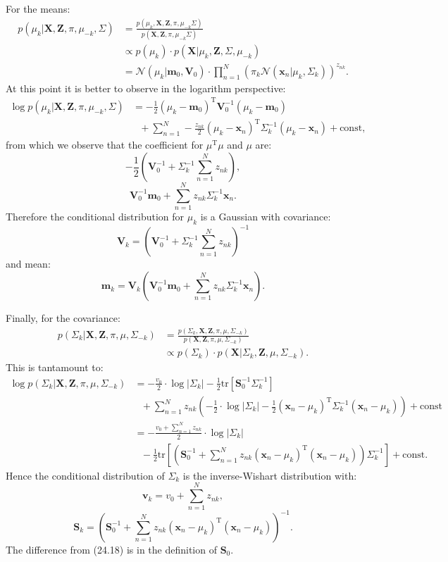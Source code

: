 \documentclass[UTF8]{ctexart}
\begin{document}
For the means:
$$
\begin{aligned}
p(\mu_{k}|\textbf{X},\textbf{Z},\pi,\mu_{-k},\Sigma)&=\frac{p(\mu_{k},\textbf{X},\textbf{Z},\pi,\mu_{-k}\Sigma)}{p(\textbf{X},\textbf{Z},\pi,\mu_{-k}\Sigma)}\\
&\propto p(\mu_{k})\cdot p(\textbf{X}|\mu_{k},\textbf{Z},\Sigma,\mu_{-k})\\
&=\mathcal{N}(\mu_{k}|\textbf{m}_{0},\textbf{V}_{0})\cdot \prod_{n=1}^{N}\left(\pi_{k}\mathcal{N}(\textbf{x}_{n}|\mu_{k},\Sigma_{k}) \right)^{z_{nk}}.
\end{aligned}
$$
At this point it is better to observe in the logarithm perspective:
$$
\begin{aligned}
\log p(\mu_{k}|\textbf{X},\textbf{Z},\pi,\mu_{-k},\Sigma)&=-\frac{1}{2}(\mu_{k}-\textbf{m}_{0})^{\text{T}}\textbf{V}_{0}^{-1}(\mu_{k}-\textbf{m}_{0}) \\
&\ \ \ +\sum_{n=1}^{N}-\frac{z_{nk}}{2}(\mu_{k}-\textbf{x}_{n})^{\text{T}}\Sigma_{k}^{-1}(\mu_{k}-\textbf{x}_{n})+\text{const},
\end{aligned}
$$
from which we observe that the coefficient for $\mu^{\text{T}}\mu$ and $\mu$ are:
$$-\frac{1}{2}\left(\textbf{V}_{0}^{-1}+\Sigma^{-1}_{k}\sum_{n=1}^{N}z_{nk} \right),$$
$$\textbf{V}^{-1}_{0}\textbf{m}_{0}+\sum_{n=1}^{N}z_{nk}\Sigma^{-1}_{k}\textbf{x}_{n}.$$
Therefore the conditional distribution for $\mu_{k}$ is a Gaussian with covariance:
$$\textbf{V}_{k}=\left(\textbf{V}_{0}^{-1}+\Sigma^{-1}_{k}\sum_{n=1}^{N}z_{nk} \right)^{-1}$$
and mean:
$$\textbf{m}_{k}=\textbf{V}_{k}\left(\textbf{V}^{-1}_{0}\textbf{m}_{0}+\sum_{n=1}^{N}z_{nk}\Sigma^{-1}_{k}\textbf{x}_{n} \right).$$

Finally, for the covariance:
$$
\begin{aligned}
p(\Sigma_{k}|\textbf{X},\textbf{Z},\pi,\mu,\Sigma_{-k})&=\frac{p(\Sigma_{k},\textbf{X},\textbf{Z},\pi,\mu,\Sigma_{-k})}{p(\textbf{X},\textbf{Z},\pi,\mu,\Sigma_{-k})}\\
&\propto p(\Sigma_{k})\cdot p(\textbf{X}|\Sigma_{k},\textbf{Z},\mu,\Sigma_{-k}).
\end{aligned}
$$
This is tantamount to:
$$
\begin{aligned}
\log p(\Sigma_{k}|\textbf{X},\textbf{Z},\pi,\mu,\Sigma_{-k})&=-\frac{v_{0}}{2}\cdot \log |\Sigma_{k}|-\frac{1}{2}\text{tr}[\textbf{S}_{0}^{-1}\Sigma_{k}^{-1}]\\
&\ \ \ +\sum_{n=1}^{N}z_{nk}\left(-\frac{1}{2}\cdot\log|\Sigma_{k}|-\frac{1}{2}(\textbf{x}_{n}-\mu_{k})^{\text{T}}\Sigma^{-1}_{k}(\textbf{x}_{n}-\mu_{k}) \right)+\text{const}\\
&=-\frac{v_{0}+\sum_{n=1}^{N}z_{nk}}{2}\cdot \log|\Sigma_{k}|\\
&\ \ \ -\frac{1}{2}\text{tr}\left[\left(\textbf{S}_{0}^{-1}+\sum_{n=1}^{N}z_{nk}(\textbf{x}_{n}-\mu_{k})^{\text{T}}(\textbf{x}_{n}-\mu_{k})\right)\Sigma^{-1}_{k}\right]+\text{const}.
\end{aligned}
$$
Hence the conditional distribution of $\Sigma_{k}$ is the inverse-Wishart distribution with:
$$\textbf{v}_{k}=v_{0}+\sum_{n=1}^{N}z_{nk},$$
$$\textbf{S}_{k}=\left(\textbf{S}_{0}^{-1}+\sum_{n=1}^{N}z_{nk}(\textbf{x}_{n}-\mu_{k})^{\text{T}}(\textbf{x}_{n}-\mu_{k})\right)^{-1}.$$
The difference from (24.18) is in the definition of $\textbf{S}_{0}$. 
\end{document}
